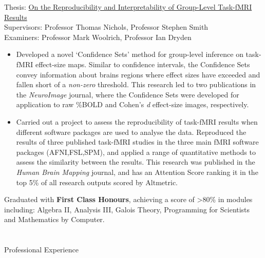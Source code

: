 \documentclass{my_cv}
\begin{document}
%
{\begin{addmargin}[2em]{1em}
    Thesis: \href{https://doi.org/10.31237/osf.io/mj7qa}{On the Reproducibility and Interpretability of Group-Level Task-fMRI Results} \\
    Supervisors: Professor Thomas Nichols, Professor Stephen Smith \\
    Examiners: Professor Mark Woolrich, Professor Ian Dryden
    \begin{itemize}[topsep=0pt,itemsep=0pt,partopsep=0pt, parsep=0pt] 
    \item Developed a novel `Confidence Sets' method for group-level inference on task-fMRI effect-size maps. Similar to confidence intervals, the Confidence Sets convey information about brains regions where effect sizes have exceeded and fallen short of a \textit{non-zero} threshold. This research led to two publications in the \textit{NeuroImage} journal, where the Confidence Sets were developed for application to raw \%BOLD and Cohen's \textit{d} effect-size images, respectively.  
    \item Carried out a project to assess the reproducibility of task-fMRI results when different software packages are used to analyse the data. Reproduced the results of three published task-fMRI studies in the three main fMRI software packages (AFNI,FSL,SPM), and applied a range of quantitative methods to assess the similarity between the results. This research was published in the \textit{Human Brain Mapping} journal, and has an Attention Score ranking it in the top 5\% of all research outputs scored by Altmetric.  
    \end{itemize}
\end{addmargin}}
    
%
    {\begin{addmargin}[2em]{1em}
    Graduated with \textbf{First Class Honours}, achieving a score of >80\% in modules including: Algebra II, Analysis III, Galois Theory, Programming for Scientists and Mathematics by Computer.
\end{addmargin}}
    
\section{\faBriefcase}{Professional Experience}
\end{document}
